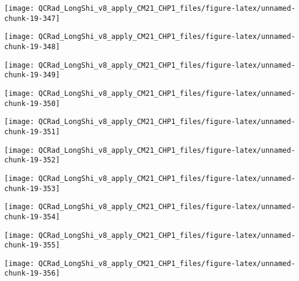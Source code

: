\documentclass[
  10pt,
  a4paper,oneside]{article}
\begin{document}
\begin{center}\texttt{[image: QCRad\_LongShi\_v8\_apply\_CM21\_CHP1\_files/figure-latex/unnamed-chunk-19-347]} \end{center}

\begin{center}\texttt{[image: QCRad\_LongShi\_v8\_apply\_CM21\_CHP1\_files/figure-latex/unnamed-chunk-19-348]} \end{center}

\begin{center}\texttt{[image: QCRad\_LongShi\_v8\_apply\_CM21\_CHP1\_files/figure-latex/unnamed-chunk-19-349]} \end{center}

\begin{center}\texttt{[image: QCRad\_LongShi\_v8\_apply\_CM21\_CHP1\_files/figure-latex/unnamed-chunk-19-350]} \end{center}

\begin{center}\texttt{[image: QCRad\_LongShi\_v8\_apply\_CM21\_CHP1\_files/figure-latex/unnamed-chunk-19-351]} \end{center}

\begin{center}\texttt{[image: QCRad\_LongShi\_v8\_apply\_CM21\_CHP1\_files/figure-latex/unnamed-chunk-19-352]} \end{center}

\begin{center}\texttt{[image: QCRad\_LongShi\_v8\_apply\_CM21\_CHP1\_files/figure-latex/unnamed-chunk-19-353]} \end{center}

\begin{center}\texttt{[image: QCRad\_LongShi\_v8\_apply\_CM21\_CHP1\_files/figure-latex/unnamed-chunk-19-354]} \end{center}

\begin{center}\texttt{[image: QCRad\_LongShi\_v8\_apply\_CM21\_CHP1\_files/figure-latex/unnamed-chunk-19-355]} \end{center}

\begin{center}\texttt{[image: QCRad\_LongShi\_v8\_apply\_CM21\_CHP1\_files/figure-latex/unnamed-chunk-19-356]} \end{center}
\end{document}
